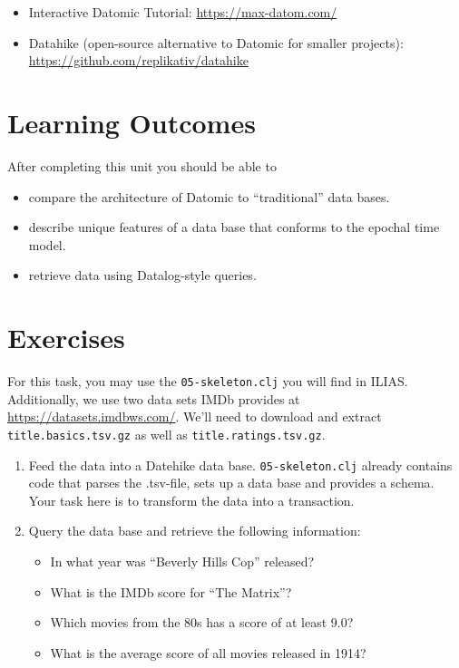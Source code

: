 \documentclass[11pt,a4paper]{article}
\begin{document}
\begin{itemize}
	
	\item Interactive Datomic Tutorial: \url{https://max-datom.com/}
	
    \item Datahike (open-source alternative to Datomic for smaller projects): \url{https://github.com/replikativ/datahike}
\end{itemize}


\section{Learning Outcomes}

After completing this unit you should be able to

\begin{itemize}
    \item compare the architecture of Datomic to \enquote{traditional} data bases.
    \item describe unique features of a data base that conforms to the epochal time model.
    \item retrieve data using Datalog-style queries.
\end{itemize}



\section{Exercises}

\begin{exercise}[myMDB]

    For this task, you may use the \verb|05-skeleton.clj| you will find in ILIAS.
    Additionally, we use two data sets IMDb provides at \url{https://datasets.imdbws.com/}.
    We'll need to download and extract \verb|title.basics.tsv.gz| as well as \verb|title.ratings.tsv.gz|.

    \begin{enumerate}
        \item Feed the data into a Datehike data base.
            \verb|05-skeleton.clj| already contains code
            that parses the .tsv-file,
            sets up a data base and provides a schema.
            Your task here is to transform the data into a transaction.

        \item Query the data base and retrieve the following information:
            \begin{itemize}
                \item In what year was \enquote{Beverly Hills Cop} released?
                \item What is the IMDb score for \enquote{The Matrix}?
                \item Which movies from the 80s has a score of at least 9.0?
                \item What is the average score of all movies released in 1914?
            \end{itemize}
    \end{enumerate}


\end{exercise}
\end{document}
